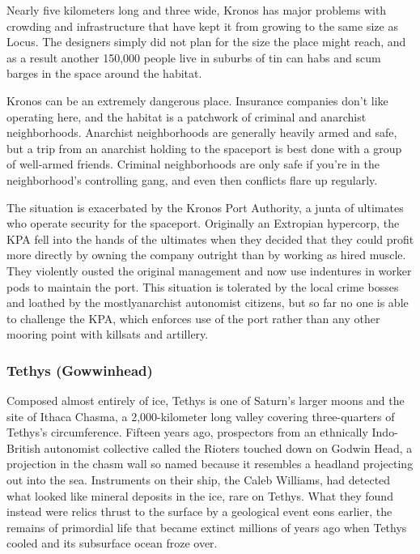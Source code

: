 Nearly five kilometers long and three wide, Kronos has major problems with crowding and infrastructure that have kept it from growing to the same size as Locus. The designers simply did not plan for the size the place might reach, and as a result another 150,000 people live in suburbs of tin can habs and scum barges in the space around the habitat. 

Kronos can be an extremely dangerous place. Insurance companies don't like operating here, and the habitat is a patchwork of criminal and anarchist neighborhoods. Anarchist neighborhoods are generally heavily armed and safe, but a trip from an anarchist holding to the spaceport is best done with a group of well-armed friends. Criminal neighborhoods are only safe if you're in the neighborhood's controlling gang, and even then conflicts flare up regularly. 

The situation is exacerbated by the Kronos Port Authority, a junta of ultimates who operate security for the spaceport. Originally an Extropian hypercorp, the KPA fell into the hands of the ultimates when they decided that they could profit more directly by owning the company outright than by working as hired muscle. They violently ousted the original management and now use indentures in worker pods to maintain the port. This situation is tolerated by the local crime bosses and loathed by the mostlyanarchist autonomist citizens, but so far no one is able to challenge the KPA, which enforces use of the port rather than any other mooring point with killsats and artillery. 

\subsubsection{Tethys (Gowwinhead)} \label{sec:tethys-gowwinhead} 

Composed almost entirely of ice, Tethys is one of Saturn's larger moons and the site of Ithaca Chasma, a 2,000-kilometer long valley covering three-quarters of Tethys's circumference. Fifteen years ago, prospectors from an ethnically Indo-British autonomist collective called the Rioters touched down on Godwin Head, a projection in the chasm wall so named because it resembles a headland projecting out into the sea. Instruments on their ship, the Caleb Williams, had detected what looked like mineral deposits in the ice, rare on Tethys. What they found instead were relics thrust to the surface by a geological event eons earlier, the remains of primordial life that became extinct millions of years ago when Tethys cooled and its subsurface ocean froze over. 

